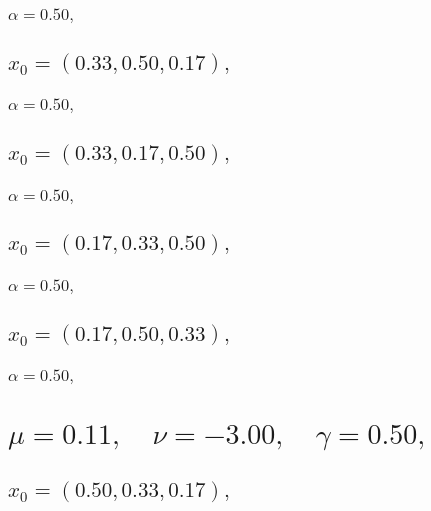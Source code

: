 \documentclass[a4paper]{article}
\begin{document}
\begin{multicols*}{2}
   \subsubsection{\(\alpha = 0.50,\quad \)}
   

   \subsection{\(x_0 = (0.33,0.50,0.17),\quad \)}
   

   \subsubsection{\(\alpha = 0.50,\quad \)}
   

   \subsection{\(x_0 = (0.33,0.17,0.50),\quad \)}
   

   \subsubsection{\(\alpha = 0.50,\quad \)}
   

   \subsection{\(x_0 = (0.17,0.33,0.50),\quad \)}
   

   \subsubsection{\(\alpha = 0.50,\quad \)}
   

   \subsection{\(x_0 = (0.17,0.50,0.33),\quad \)}
   

   \subsubsection{\(\alpha = 0.50,\quad \)}
   

   \section{\(\mu = 0.11,\quad \nu = -3.00,\quad \gamma = 0.50,\quad \)}
   

   \subsection{\(x_0 = (0.50,0.33,0.17),\quad \)}
   


\end{multicols*}
\end{document}
